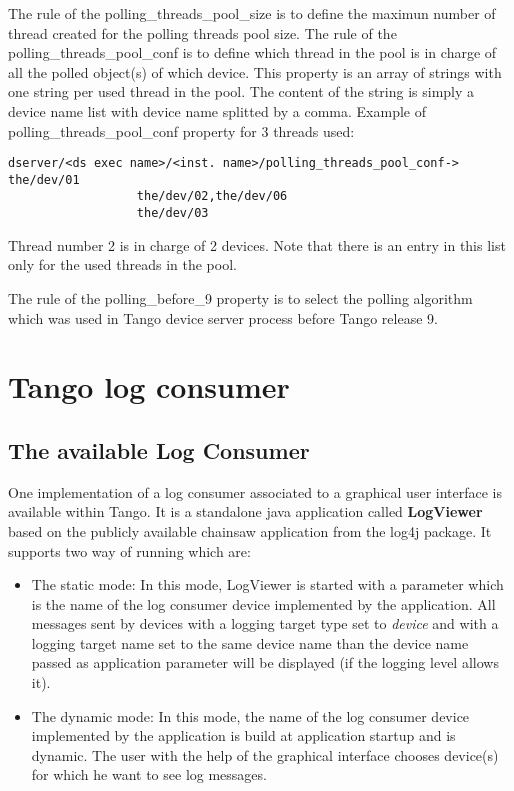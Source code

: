\vspace{0.3cm}


The rule of the polling\_threads\_pool\_size
is to define the maximun number of thread created for the polling
threads pool size. The rule of the polling\_threads\_pool\_conf
is to define which thread in the pool is in charge of all the polled
object(s) of which device. This property is an array of strings with
one string per used thread in the pool. The content of the string
is simply a device name list with device name splitted by a comma.
Example of polling\_threads\_pool\_conf property for 3 threads used:
\begin{verbatim}
dserver/<ds exec name>/<inst. name>/polling_threads_pool_conf-> the/dev/01
                  the/dev/02,the/dev/06
                  the/dev/03
\end{verbatim}
Thread number 2 is in charge of 2 devices. Note that there is an entry
in this list only for the used threads in the pool.

The rule of the polling\_before\_9
property is to select the polling algorithm which was used in Tango
device server process before Tango release 9.


\section{Tango log consumer }
\label{sec:Tango-log-consumer}


\subsection{The available Log Consumer}

One implementation of a log consumer associated to a graphical user
interface is available within Tango. It is a standalone java application
called \textbf{LogViewer} based on the publicly available chainsaw
application from the log4j package. It supports two way of running
which are:
\begin{itemize}
\item The static mode: In this mode, LogViewer is started with a parameter
which is the name of the log consumer device implemented by the application.
All messages sent by devices with a logging target type set to \emph{device}
and with a logging target name set to the same device name than the
device name passed as application parameter will be displayed (if
the logging level allows it).
\item The dynamic mode: In this mode, the name of the log consumer device
implemented by the application is build at application startup and
is dynamic. The user with the help of the graphical interface chooses
device(s) for which he want to see log messages.
\end{itemize}

